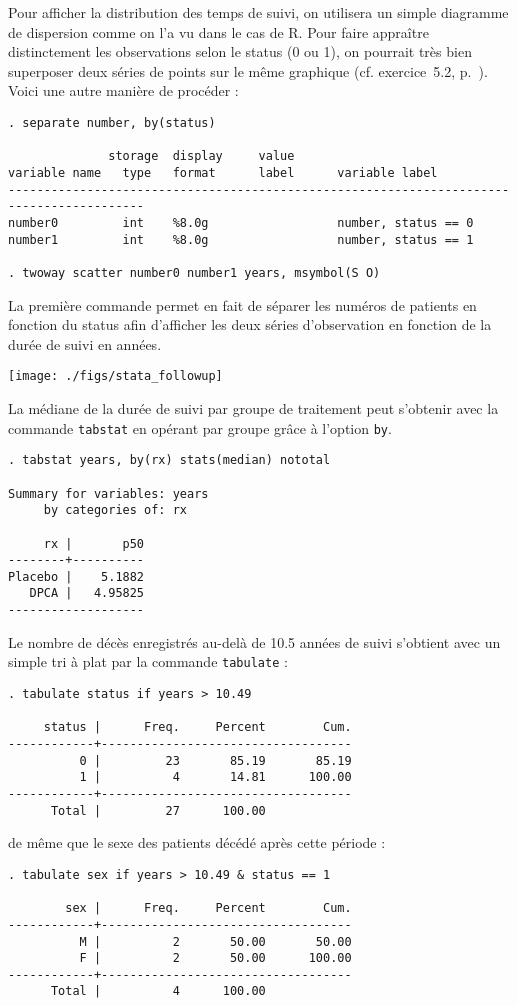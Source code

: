Pour afficher la distribution des temps de suivi, on utilisera un simple
diagramme de dispersion comme on l'a vu dans le cas de R. Pour faire
appraître distinctement les observations selon le status (0 ou 1), on
pourrait très bien superposer deux séries de points sur le même graphique
(cf. exercice~5.2, p.~\pageref{para:twoway}). Voici une autre manière de
procéder :
\begin{verbatim}
. separate number, by(status)

              storage  display     value
variable name   type   format      label      variable label
-----------------------------------------------------------------------------------------
number0         int    %8.0g                  number, status == 0
number1         int    %8.0g                  number, status == 1

. twoway scatter number0 number1 years, msymbol(S O)
\end{verbatim}
La première commande permet en fait de séparer les numéros de patients en
fonction du status afin d'afficher les deux séries d'observation en fonction
de la durée de suivi en années.

\texttt{[image: ./figs/stata\_followup]}

La médiane de la durée de suivi par groupe de traitement peut s'obtenir avec
la commande \texttt{tabstat} en opérant par groupe grâce à l'option
\texttt{by}. 
\begin{verbatim}
. tabstat years, by(rx) stats(median) nototal

Summary for variables: years
     by categories of: rx 

     rx |       p50
--------+----------
Placebo |    5.1882
   DPCA |   4.95825
-------------------
\end{verbatim}

Le nombre de décès enregistrés au-delà de 10.5 années de suivi s'obtient
avec un simple tri à plat par la commande \texttt{tabulate} :
\begin{verbatim}
. tabulate status if years > 10.49

     status |      Freq.     Percent        Cum.
------------+-----------------------------------
          0 |         23       85.19       85.19
          1 |          4       14.81      100.00
------------+-----------------------------------
      Total |         27      100.00
\end{verbatim}
de même que le sexe des patients décédé après cette période :
\begin{verbatim}
. tabulate sex if years > 10.49 & status == 1

        sex |      Freq.     Percent        Cum.
------------+-----------------------------------
          M |          2       50.00       50.00
          F |          2       50.00      100.00
------------+-----------------------------------
      Total |          4      100.00
\end{verbatim}

